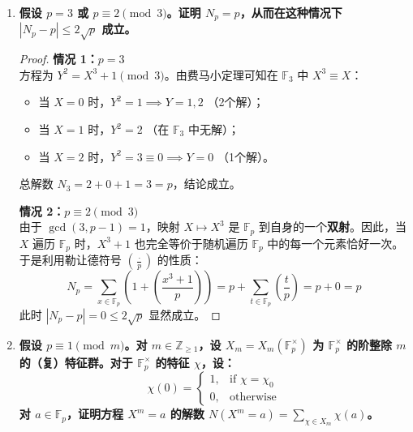 \documentclass[]{article}
\begin{document}
	\begin{enumerate}[label=(\\arabic*)]
		\item \textbf{假设 $p=3$ 或 $p \equiv 2 \pmod 3$。证明 $N_p = p$，从而在这种情况下 $|N_p - p| \le 2\sqrt{p}$ 成立。}
		
		\begin{proof}
			\textbf{情况 1：$p=3$} \\
			方程为 $Y^2 = X^3 + 1 \pmod 3$。由费马小定理可知在 $\mathbb{F}_3$ 中 $X^3 \equiv X$：
			\begin{itemize}
				\item 当 $X=0$ 时，$Y^2=1 \implies Y=1, 2$ （2个解）；
				\item 当 $X=1$ 时，$Y^2=2$ （在 $\mathbb{F}_3$ 中无解）；
				\item 当 $X=2$ 时，$Y^2=3 \equiv 0 \implies Y=0$ （1个解）。
			\end{itemize}
			总解数 $N_3 = 2 + 0 + 1 = 3 = p$，结论成立。
			
			\textbf{情况 2：$p \equiv 2 \pmod 3$} \\
			由于 $\gcd(3, p-1) = 1$，映射 $X \mapsto X^3$ 是 $\mathbb{F}_p$ 到自身的一个\textbf{双射}。因此，当 $X$ 遍历 $\mathbb{F}_p$ 时，$X^3+1$ 也完全等价于随机遍历 $\mathbb{F}_p$ 中的每一个元素恰好一次。
			于是利用勒让德符号 $\left(\frac{\cdot}{p}\right)$ 的性质：
			\[ N_p = \sum_{x \in \mathbb{F}_p} \left( 1 + \left(\frac{x^3+1}{p}\right) \right) = p + \sum_{t \in \mathbb{F}_p} \left(\frac{t}{p}\right) = p + 0 = p \]
			此时 $|N_p - p| = 0 \le 2\sqrt{p}$ 显然成立。
		\end{proof}
		
		\item \textbf{假设 $p \equiv 1 \pmod m$。对 $m \in \mathbb{Z}_{\ge 1}$，设 $X_m = X_m(\mathbb{F}_p^\times)$ 为 $\mathbb{F}_p^\times$ 的阶整除 $m$ 的（复）特征群。对于 $\mathbb{F}_p^\times$ 的特征 $\chi$，设：
			\[ \chi(0) = \begin{cases} 1, & \text{if } \chi = \chi_0 \\ 0, & \text{otherwise} \end{cases} \]
			对 $a \in \mathbb{F}_p$，证明方程 $X^m = a$ 的解数 $N(X^m = a) = \sum_{\chi \in X_m} \chi(a)$。}
		

\end{enumerate}
\end{document}
